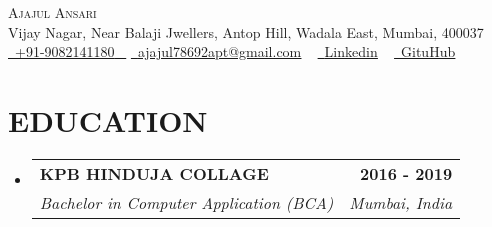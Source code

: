 \documentclass[letterpaper,11pt]{article}
\makeatletter
\newcommand{\resumeSubheading}[4]{
  \vspace{-2pt}\item
    \begin{tabular*}{1.0\textwidth}[t]{l@{\extracolsep{\fill}}r}
      \textbf{\large#1} & \textbf{\small #2} \\
      \textit{\large#3} & \textit{\small #4} \\
      
    \end{tabular*}\vspace{-7pt}
}
\newcommand{\resumeSubHeadingListStart}{\begin{itemize}[leftmargin=0.0in, label={}]}
\newcommand{\resumeSubHeadingListEnd}{\end{itemize}}
\makeatother
\begin{document}


\begin{center}
    {\Huge \scshape Ajajul Ansari} \\ \vspace{1pt}
    Vijay Nagar, Near Balaji Jwellers, Antop Hill, Wadala East, Mumbai, 400037
    \\ \vspace{1pt}
    \small \href{tel:+xxxxxxxxxxxx}{ \raisebox{-0.1\height}\faPhone\ \underline{+91-9082141180} ~} \href{ajajul78692apt@gmail.com}{\raisebox{-0.2\height}\faEnvelope\  \underline{ajajul78692apt@gmail.com}}
    ~ 
    \href{https://www.linkedin.com/in/ajajul5}{\raisebox{-0.2\height}\faLinkedinSquare\ \underline{Linkedin}}
    ~
    \href{https://github.com/ajajul5}{\raisebox{-0.2\height}\faGithub\ \underline{GituHub}} ~
    \vspace{-8pt}
\end{center}


\section{EDUCATION}
  \resumeSubHeadingListStart
    \resumeSubheading
      {KPB HINDUJA COLLAGE}{2016 - 2019}
      {Bachelor in Computer Application (BCA)}{Mumbai, India}
      \vspace{7pt}
  \resumeSubHeadingListEnd



\end{document}
